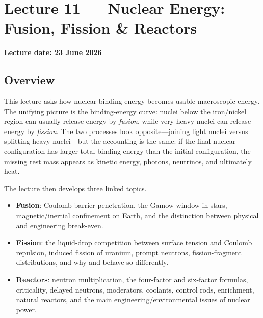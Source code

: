 
\section{Lecture 11 — Nuclear Energy: Fusion, Fission \& Reactors}
\label{sec:lec11}

\noindent\textbf{\textcolor{doc}{Lecture date: 23 June 2026}}

\subsection*{Overview}
This lecture asks how nuclear binding energy becomes usable macroscopic energy.
The unifying picture is the binding-energy curve: nuclei below the iron/nickel
region can usually release energy by \emph{fusion}, while very heavy nuclei can
release energy by \emph{fission}. The two processes look opposite---joining
light nuclei versus splitting heavy nuclei---but the accounting is the same: if
the final nuclear configuration has larger total binding energy than the initial
configuration, the missing rest mass appears as kinetic energy, photons,
neutrinos, and ultimately heat.

The lecture then develops three linked topics.
\begin{itemize}[nosep]
  \item \textbf{Fusion}: Coulomb-barrier penetration, the Gamow window in
        stars, magnetic/inertial confinement on Earth, and the distinction
        between physical and engineering break-even.
  \item \textbf{Fission}: the liquid-drop competition between surface tension
        and Coulomb repulsion, induced fission of uranium, prompt neutrons,
        fission-fragment distributions, and why  and
         behave so differently.
  \item \textbf{Reactors}: neutron multiplication, the four-factor and
        six-factor formulas, criticality, delayed neutrons, moderators,
        coolants, control rods, enrichment, natural reactors, and the main
        engineering/environmental issues of nuclear power.
\end{itemize}

